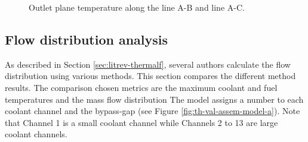 \begin{figure}[htbp!]
  \centering
  \hfill
  \caption{Outlet plane temperature along the line A-B and line A-C.}
  \label{fig:th-val-assem-temps}
\end{figure}


\subsection{Flow distribution analysis}
\label{sec:flowdistrib}

As described in Section \ref{sec:litrev-thermalf}, several authors calculate the flow distribution using various methods.
This section compares the different method results.
The comparison chosen metrics are the maximum coolant and fuel temperatures and the mass flow distribution
The model assigns a number to each coolant channel and the bypass-gap (see Figure \ref{fig:th-val-assem-model-a}).
Note that Channel 1 is a small coolant channel while Channels 2 to 13 are large coolant channels.

